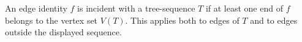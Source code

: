 \begin{definition}
An edge identity $f$ is incident with a tree-sequence $T$ if at least one
end of $f$ belongs to the vertex set $V(T)$.  This applies both to edges of
$T$ and to edges outside the displayed sequence.
\end{definition}
